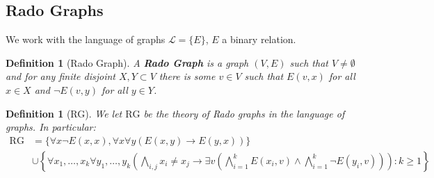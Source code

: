 \documentclass[]{article}
\theoremstyle{custhm}
\theoremstyle{cusdef}
\newtheorem{defin}[theorem]{Definition}
\theoremstyle{custhm}
\theoremstyle{custhm}
\theoremstyle{custhm}
\theoremstyle{ex}
\theoremstyle{custhm}
\theoremstyle{cusdef}
\theoremstyle{remark}
\theoremstyle{remark}
\newcommand{\ra}{\rightarrow}
\newcommand{\undf}[1]{\textit{\textbf{#1}}}
\renewcommand{\L}{\mathcal{L}}
\newcommand{\rg}{\textrm{RG}}
\begin{document}
\subsection*{Rado Graphs}

We work with the language of graphs $\L = \{E\}$, $E$ a binary relation.

\begin{defin}[Rado Graph]
A \undf{Rado Graph} is a graph $(V,E)$ such that $V\ne \emptyset$ and for any finite disjoint $X,Y\subset V$ there is some $v\in V$ such that $E(v,x)$ for all $x\in X$ and $\neg E(v,y)$ for all $y\in Y$.
\end{defin}
\begin{defin}[RG]
We let $\rg$ be the theory of Rado graphs in the language of graphs. In particular:
\begin{align*}
	\rg &= \{ \forall x \neg E(x,x),\forall x\forall y(E(x,y)\ra E(y,x)) \}\\
		&\cup \left\lbrace \forall x_1,\dots,x_k\forall y_1,\dots,y_k\left(\bigwedge_{i,j}x_i\ne x_j \ra \exists v\left(\bigwedge_{i=1}^{k}E(x_i,v) \land \bigwedge_{i=1}^{k}\neg E(y_i,v)\right)\right):k\ge 1\right\rbrace
\end{align*}
\end{defin}
\end{document}

